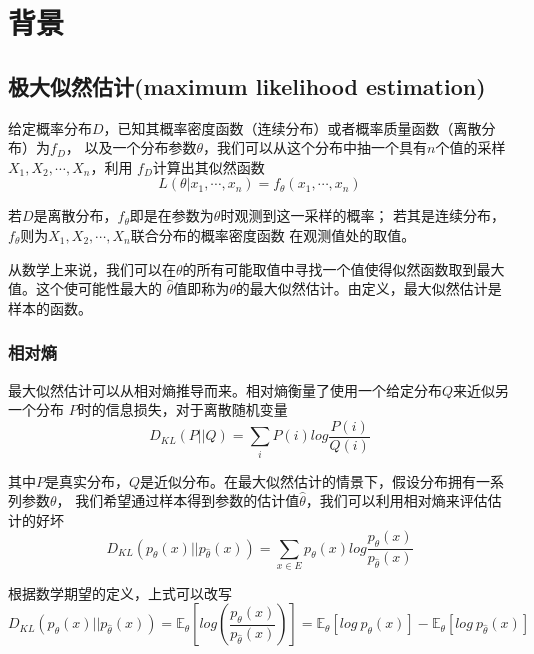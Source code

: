 \chapter{背景}

\section{极大似然估计(maximum likelihood estimation)}

给定概率分布$D$，已知其概率密度函数（连续分布）或者概率质量函数（离散分布）为$f_D$，
以及一个分布参数$\theta$，我们可以从这个分布中抽一个具有$n$个值的采样$X_1,X_2,\cdots,X_n$，利用
$f_D$计算出其似然函数
\begin{equation}
    L(\theta|x_1,\cdots,x_n)=f_\theta(x_1,\cdots,x_n)
\end{equation}

若$D$是离散分布，$f_\theta$即是在参数为$\theta$时观测到这一采样的概率；
若其是连续分布，$f_\theta$则为$X_1,X_2,\cdots,X_n$联合分布的概率密度函数
在观测值处的取值。

从数学上来说，我们可以在$\displaystyle \theta$的所有可能取值中寻找一个值使得似然函数取到最大值。这个使可能性最大的
$\displaystyle {\widehat {\theta }}$值即称为$\displaystyle \theta$的最大似然估计。由定义，最大似然估计是样本的函数。

\subsection*{相对熵}

最大似然估计可以从相对熵推导而来。相对熵衡量了使用一个给定分布$Q$来近似另一个分布
$P$时的信息损失，对于离散随机变量
\begin{equation}
    D_{KL}(P||Q)=\sum_{i}P(i)log\frac{P(i)}{Q(i)}
\end{equation}

其中$P$是真实分布，$Q$是近似分布。在最大似然估计的情景下，假设分布拥有一系列参数$\theta$，
我们希望通过样本得到参数的估计值$\hat{\theta}$，我们可以利用相对熵来评估估计的好坏
\begin{equation}
    D_{KL}(p_\theta(x)||p_{\hat{\theta}}(x))=\sum_{x\in E}p_\theta(x)log \frac{p_\theta(x)}{p_{\hat{\theta}}(x)}
\end{equation}

根据数学期望的定义，上式可以改写
\begin{equation}
    D_{KL}(p_\theta(x)||p_{\hat{\theta}}(x))=\mathbb{E}_\theta[log(\frac{p_\theta(x)}{p_{\hat{\theta}}(x)})]
    =\mathbb{E}_\theta[log\ p_\theta(x)]-\mathbb{E}_\theta[log\ p_{\hat{\theta}}(x)]
\end{equation}

